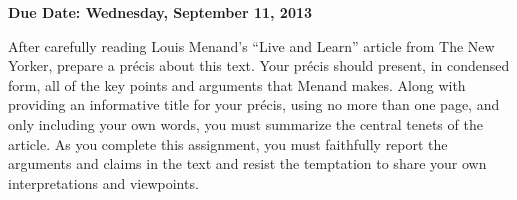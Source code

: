 

\usepackage[compact]{titlesec}



\vspace*{-.2in}
\begin{center}
	{\bf Due Date: Wednesday, September 11, 2013}
\end{center}

After carefully reading Louis Menand's ``Live and Learn'' article from The New Yorker, prepare a pr\'{e}cis about this
text.  Your pr\'{e}cis should present, in condensed form, all of the key points and arguments that Menand makes. Along
with providing an informative title for your pr\'{e}cis, using no more than one page, and only including your own words,
you must summarize the central tenets of the article. As you complete this assignment, you must faithfully report the
arguments and claims in the text and resist the temptation to share your own interpretations and viewpoints.
 

